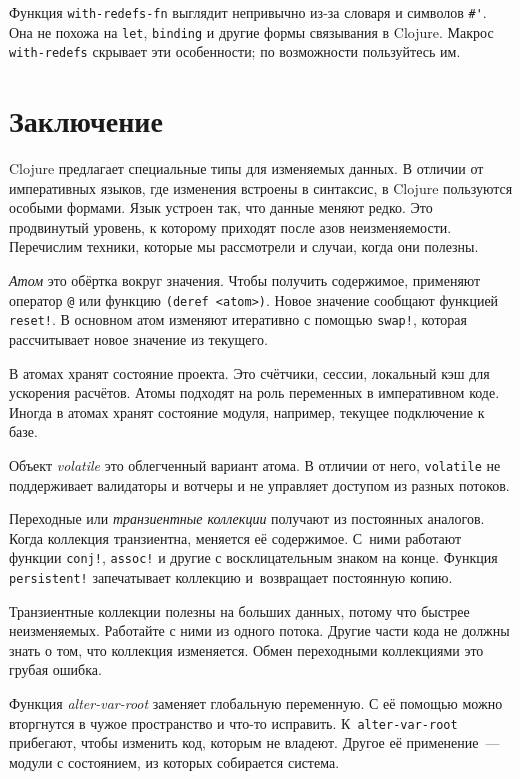 Функция \verb|with-redefs-fn| выглядит непривычно из-за словаря и символов
\verb|#'|. Она не похожа на \verb|let|, \verb|binding| и другие формы
связывания в Clojure. Макрос \verb|with-redefs| скрывает эти особенности; по
возможности пользуйтесь им.

\section{Заключение}

Clojure предлагает специальные типы для изменяемых данных. В отличии от
императивных языков, где изменения встроены в синтаксис, в Clojure пользуются
особыми формами. Язык устроен так, что данные меняют редко. Это продвинутый
уровень, к которому приходят после азов неизменяемости. Перечислим техники,
которые мы рассмотрели и случаи, когда они полезны.

\emph{Атом} это обёртка вокруг значения. Чтобы получить содержимое,
применяют оператор \verb|@| или функцию \verb|(deref <atom>)|. Новое
значение сообщают функцией \verb|reset!|. В основном атом изменяют итеративно
с помощью \verb|swap!|, которая рассчитывает новое значение из текущего.

В атомах хранят состояние проекта. Это счётчики, сессии, локальный кэш
для ускорения расчётов. Атомы подходят на роль переменных в императивном
коде. Иногда в атомах хранят состояние модуля, например, текущее подключение к
базе.

Объект \emph{volatile} это облегченный вариант атома. В отличии от него,
\verb|volatile| не поддерживает валидаторы и вотчеры и не управляет доступом
из разных потоков.

Переходные или \emph{транзиентные коллекции} получают из постоянных
аналогов. Когда коллекция транзиентна, меняется её содержимое. С~ними
работают функции \verb|conj!|, \verb|assoc!| и другие с восклицательным
знаком на конце. Функция \verb|persistent!| запечатывает коллекцию
и~возвращает постоянную копию.

Транзиентные коллекции полезны на больших данных, потому что быстрее
неизменяемых. Работайте с ними из одного потока. Другие части кода не должны
знать о том, что коллекция изменяется. Обмен переходными коллекциями это грубая
ошибка.

Функция \emph{alter-var-root} заменяет глобальную переменную. С её помощью можно
вторгнутся в чужое пространство и что-то исправить. К~\verb|alter-var-root|
прибегают, чтобы изменить код, которым не владеют. Другое её применение~---
модули с состоянием, из которых собирается система.

